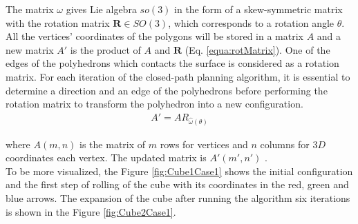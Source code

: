 \noindent The matrix $\omega$ gives Lie algebra $so(3)$ in the form of a skew-symmetric matrix with the rotation matrix $\textbf{R}\in SO(3)$, which corresponds to a rotation angle $\theta$.
All the vertices' coordinates of the polygons will be stored in a matrix $A$ and a new matrix $A'$ is the product of $A$ and $\textbf{R}$ (Eq. \ref{equa:rotMatrix}). 
One of the edges of the polyhedrons which contacts the surface is considered as a rotation matrix.
For each iteration of the closed-path planning algorithm, it is essential to determine a direction and an edge of the polyhedrons before performing the rotation matrix to transform the polyhedron into a new configuration.
%
\begin{equation}
\begin{split}
A' = AR_{\hat{\omega}(\theta)}
\end{split}	
\label{equa:rotMatrix}
\end{equation}

where $A(m,n)$ is the matrix of $m$ rows for vertices and $n$ columns for $3D$ coordinates each vertex. The updated matrix is $A'(m',n')$ .\\

%
%
\noindent To be more visualized, the Figure \ref{fig:Cube1Case1} shows the initial configuration and the first step of rolling of the cube with its coordinates in the red, green and blue arrows. 
The expansion of the cube after running the algorithm six iterations is shown in the Figure \ref{fig:Cube2Case1}. 

